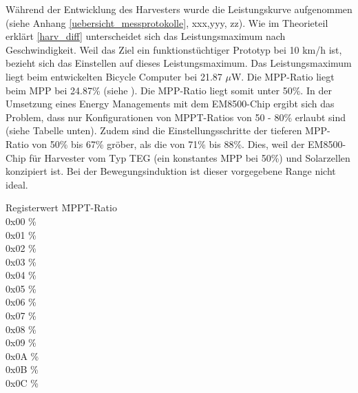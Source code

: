 Während der Entwicklung des Harvesters wurde die Leistungskurve aufgenommen (siehe Anhang \ref{uebersicht_messprotokolle}, xxx,yyy, zz). Wie im Theorieteil erklärt \ref{harv_diff} unterscheidet sich das Leistungsmaximum nach Geschwindigkeit. Weil das Ziel ein funktionstüchtiger Prototyp bei 10 km/h ist, bezieht sich das Einstellen auf dieses Leistungsmaximum. Das Leistungsmaximum liegt beim entwickelten Bicycle Computer bei 21.87  $\mu$W. Die MPP-Ratio liegt beim MPP bei 24.87\thinspace\% (siehe ). Die MPP-Ratio liegt somit unter 50\thinspace\%. In der Umsetzung eines Energy Managements mit dem EM8500-Chip ergibt sich das Problem, dass nur Konfigurationen von MPPT-Ratios von 50 - 80\thinspace\% erlaubt sind (siehe Tabelle unten). Zudem sind die Einstellungsschritte der tieferen MPP-Ratio von 50\thinspace\% bis 67\thinspace\% gröber, als die von 71\thinspace\% bis 88\thinspace\%. Dies, weil der EM8500-Chip für Harvester vom Typ TEG (ein konstantes MPP bei 50\thinspace\%) und Solarzellen konzipiert ist. Bei der Bewegungsinduktion ist dieser vorgegebene Range nicht ideal.

\begin{minipage}{\textwidth}
    \begin{tabbing}
    Registerwert   \quad\= MPPT-Ratio    \\[0.8ex]
    0x00           \thinspace\% \\
    0x01           \thinspace\%\\
    0x02           \thinspace\%\\
    0x03           \thinspace\%\\
    0x04           \thinspace\%\\
    0x05           \thinspace\%\\
    0x06           \thinspace\% \\
    0x07           \thinspace\%\\
    0x08           \thinspace\%\\
    0x09           \thinspace\%\\
    0x0A           \thinspace\% \\
    0x0B           \thinspace\%\\
    0x0C           \thinspace\%\\
    \end{tabbing}
\end{minipage}

